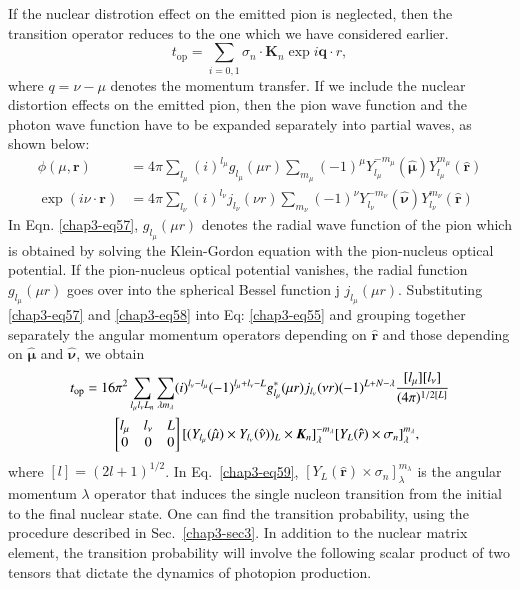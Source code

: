 If the nuclear distrotion effect on the emitted pion is neglected, then the transition operator reduces to the one which we have considered earlier.
\begin{equation}
t_{\text{op}} = \sum_{i=0, 1} \sigma_n \cdot {\boldsymbol K}_n \exp i {\boldsymbol q \cdot r}, \label{chap3-eq56}
\end{equation}
where $q= \nu -\mu$ denotes the momentum transfer. If we include the nuclear distortion effects on the emitted pion, then the pion wave function and the photon wave function have to be expanded separately into partial waves, as shown below:
\begin{align}
  \phi (\mu , {\boldsymbol r}) & = 4 \pi \sum_{l_{\mu}} (i)^{l_\mu} g_{l_\mu}(\mu r)\sum_{m_\mu} (-1)^\mu Y_{l_\mu}^{-m _\mu} ({\boldsymbol \hat{\mu}}) Y_{l_\mu}^{m_\mu} ({\boldsymbol \hat{r}}) \label{chap3-eq57}\\
  \exp (i \nu \cdot {\boldsymbol r}) & = 4 \pi \sum_{l_\nu} (i)^{l_\nu} j_{l_\nu} (\nu r) \sum_{m_\nu} (-1)^\nu Y_{l_\nu}^{-m_\nu} ({\boldsymbol \hat{\nu}}) Y_{l_\nu}^{m_\nu} ({\boldsymbol \hat{r}}) \label{chap3-eq58}
\end{align}
In Eqn. \eqref{chap3-eq57}, $g_{l_\mu} (\mu r)$ denotes the radial wave function of the pion which is obtained by solving the Klein-Gordon equation with the pion-nucleus optical potential. If the pion-nucleus optical potential vanishes, the radial function $g_{l_\mu}(\mu r)$ goes over into the spherical Bessel function j $j_{l_\mu}(\mu r)$. Substituting \eqref{chap3-eq57} and \eqref{chap3-eq58} into Eq: \eqref{chap3-eq55} and grouping together separately the angular momentum operators depending on ${\boldsymbol \hat{r}}$ and those depending on ${\boldsymbol \hat{\mu}}$ and ${\boldsymbol \hat{\nu}}$, we obtain
\begin{align}
  t_{\text{op}} & = 16\pi^2 \sum_{l_\mu l_\nu L_n} \sum_{\lambda m_\lambda} (i)^{l_\nu - l_\mu} (-1)^{l_\mu + l_\nu - L} g_{l_\mu}^\ast (\mu r)j_{l_\nu} (\nu r) (-1)^{L+N-\lambda} \frac{[l_\mu][l_\nu]}{(4 \pi)^{1/2 [L]}}\notag\\
  & \qquad \begin{bmatrix} l_\mu & l_\nu & L\\ 0 & 0 & 0   \end{bmatrix} [(Y_{l_\mu}(\hat{\mu}) \times Y_{l_\nu} (\hat{\nu}))_L \times {\boldsymbol K}_n]_\lambda^{-m_\lambda} [Y_L ({\boldsymbol \hat{r}}) \times \sigma_n]_{\lambda}^{m_\lambda}, \label{chap3-eq59}
\end{align}
where $[l] = (2l+1)^{1/2}$. In Eq.\ \eqref{chap3-eq59}, $[Y_L ({\boldsymbol \hat{r}}) \times \sigma_n]_\lambda^{m_\lambda}$ is the angular momentum $\lambda$ operator that induces the single nucleon transition from the initial to the final nuclear state. One can find the transition probability, using the procedure described in Sec.\ \ref{chap3-sec3}. In addition to the nuclear matrix element, the transition probability will involve the following scalar product of two tensors that dictate the dynamics of photopion production.
